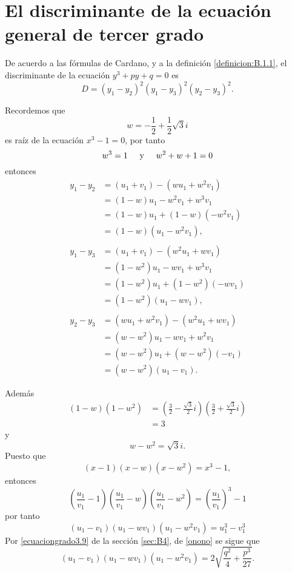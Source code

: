 \newpage

\section{El discriminante de la ecuación general de tercer grado}\label{disc_tercergrado}

De acuerdo a las fórmulas de Cardano, y a la definición \ref{definicion:B.1.1}, el discriminante de la ecuación $y^3+py+q=0$ es
$$D=(y_1-y_2)^2(y_1-y_3)^2(y_2-y_3)^2.$$

Recordemos que
$$w=-\frac{1}{2}+\frac{1}{2}\sqrt{3}i$$
es raíz de la ecuación $x^3-1=0$, por tanto
$$w^3=1 \hspace{0.5cm} \text{y} \hspace{0.5cm} w^2+w+1=0$$
entonces
\begin{align*}
    y_1-y_2 &=(u_1+v_1)-\left(wu_1+w^2v_1\right) \\
    &=(1-w)u_1-w^2v_1+w^3v_1 \\
    &=(1-w)u_1+(1-w)\left(-w^2v_1\right) \\
    &=(1-w)\left(u_1-w^2v_1\right), \\
    & \\
    y_1-y_3 &=(u_1+v_1)-\left( w^2u_1+wv_1 \right) \\
    &=\left( 1-w^2 \right) u_1-wv_1+w^3v_1 \\
    &=\left( 1-w^2 \right) u_1+\left( 1-w^2 \right) (-wv_1) \\
    &=\left( 1-w^2 \right) (u_1-wv_1), \\
    & \\
    y_2-y_3 &=\left( wu_1+w^2v_1 \right) - \left( w^2u_1+wv_1 \right) \\
    &=\left( w-w^2 \right) u_1-wv_1+w^2v_1 \\
    &=\left( w-w^2 \right) u_1+\left( w-w^2 \right) (-v_1) \\
    &=\left( w-w^2 \right) (u_1-v_1).
\end{align*}

Además
\begin{align*}
    (1-w)\left( 1-w^2 \right) &= \left( \frac{3}{2}-\frac{\sqrt{3}}{2} i \right) \left( \frac{3}{2}+\frac{\sqrt{3}}{2} i \right) \\
    &=3
\end{align*}
y
$$w-w^2=\sqrt{3}i.$$
Puesto que
$$(x-1)(x-w)\left( x-w^2 \right) =x^3-1,$$
entonces
$$\left( \frac{u_1}{v_1} -1 \right) \left( \frac{u_1}{v_1} -w \right) \left( \frac{u_1}{v_1}-w^2 \right) = \left( \frac{u_1}{v_1} \right)^3 -1$$
por tanto
\begin{equation}
    (u_1-v_1)(u_1-wv_1)\left( u_1-w^2v_1 \right) = u^3_1-v^3_1 \label{onono}
\end{equation}
Por \eqref{ecuaciongrado3.9} de la sección \ref{sec:B4}, de \eqref{onono} se sigue que
$$(u_1-v_1)(u_1-wv_1)\left( u_1-w^2v_1 \right) = 2 \sqrt{\frac{q^2}{4}+\frac{p^3}{27}}.$$

